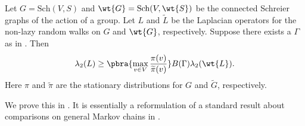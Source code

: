 \begin{lemma}\label{lem:comparison schreier}
    Let $G=\mathrm{Sch}(V,S)$ and $\wt{G}=\mathrm{Sch}(V,\wt{S})$ be the connected Schreier graphs of the action of a group. Let $L$ and $\widetilde{L}$ be the Laplacian operators for the non-lazy random walks on $G$ and $\wt{G}$, respectively. Suppose there exists a $\Gamma$ as in . Then 
    \begin{align*}
        \lambda_2(L)\geq \pbra{\max_{v\in V}\frac{\pi(v)}{\widetilde{\pi}(v)}}B({\Gamma})\lambda_2(\wt{L}).
    \end{align*}
    Here $\pi$ and $\widetilde{\pi}$ are the stationary distributions for $G$ and $\widetilde{G}$, respectively.
\end{lemma}

We prove this in . It is essentially a reformulation of a standard result about comparisons on general Markov chains in \cite{wilmer2009markov}. 

